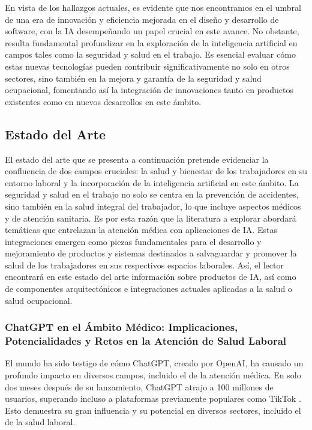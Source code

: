 En vista de los hallazgos actuales, es evidente que nos encontramos en el umbral de una era de innovación y eficiencia mejorada en el diseño y desarrollo de software, con la IA desempeñando un papel crucial en este avance. No obstante, resulta fundamental profundizar en la exploración de la inteligencia artificial en campos tales como la seguridad y salud en el trabajo. Es esencial evaluar cómo estas nuevas tecnologías pueden contribuir significativamente no solo en otros sectores, sino también en la mejora y garantía de la seguridad y salud ocupacional, fomentando así la integración de innovaciones tanto en productos existentes como en nuevos desarrollos en este ámbito.

\subsection{Estado del Arte}
El estado del arte que se presenta a continuación pretende evidenciar la confluencia de dos campos cruciales: la salud y bienestar de los trabajadores en su entorno laboral y la incorporación de la inteligencia artificial en este ámbito. La seguridad y salud en el trabajo no solo se centra en la prevención de accidentes, sino también en la salud integral del trabajador, lo que incluye aspectos médicos y de atención sanitaria. Es por esta razón que la literatura a explorar abordará temáticas que entrelazan la atención médica con aplicaciones de IA. Estas integraciones emergen como piezas fundamentales para el desarrollo y mejoramiento de productos y sistemas destinados a salvaguardar y promover la salud de los trabajadores en sus respectivos espacios laborales. Así, el lector encontrará en este estado del arte información sobre productos de IA, así como de componentes arquitectónicos e integraciones actuales aplicadas a la salud o salud ocupacional.

\subsubsection{ChatGPT en el Ámbito Médico: Implicaciones, Potencialidades y Retos en la Atención de Salud Laboral}
El mundo ha sido testigo de cómo ChatGPT, creado por OpenAI, ha causado un profundo impacto en diversos campos, incluido el de la atención médica. En solo dos meses después de su lanzamiento, ChatGPT atrajo a 100 millones de usuarios, superando incluso a plataformas previamente populares como TikTok \citep{Kleesiek2023AnOnly}. Esto demuestra su gran influencia y su potencial en diversos sectores, incluido el de la salud laboral.

